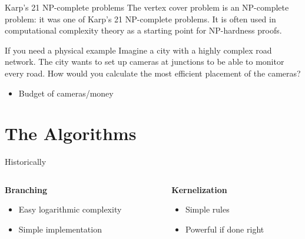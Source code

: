 \documentclass{beamer}
\begin{document}
\begin{frame}{Karp's 21 NP-complete problems}
    The vertex cover problem is an NP-complete problem: it was one of Karp's 21 NP-complete problems. It is often used in computational complexity theory as a starting point for NP-hardness proofs.
\end{frame}

\begin{frame}{If you need a physical example}
    Imagine a city with a highly complex road network. The city wants to set up cameras at junctions to be able to monitor every road. How would you calculate the most efficient placement of the cameras?

    \begin{itemize}
        \item Budget of cameras/money
    \end{itemize}
\end{frame}

\section{The Algorithms}

\begin{frame}{Historically}
    \begin{block}{}
        \begin{columns}
            \begin{column}{0.45\textwidth}
                \textbf{Branching}

                \begin{itemize}
                    \item Easy logarithmic complexity
                    \item Simple implementation
                \end{itemize}
            \end{column}
            \begin{column}{0.45\textwidth}
                \textbf{Kernelization}

                \begin{itemize}
                    \item Simple rules
                    \item Powerful if done right
                \end{itemize}
            \end{column}
        \end{columns}
    \end{block}
\end{frame}
\end{document}
